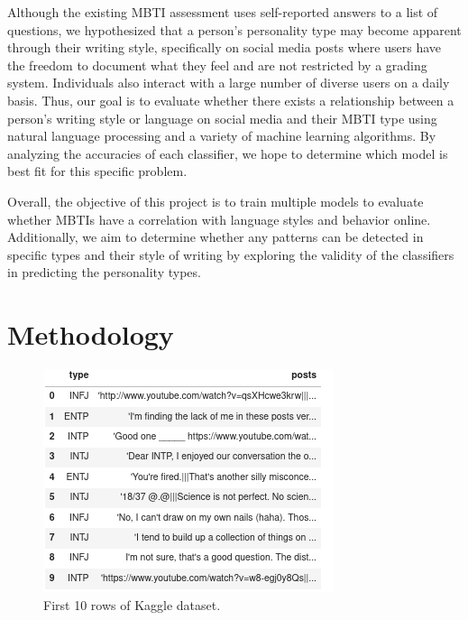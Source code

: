 \documentclass{article}
\begin{document}
Although the existing MBTI assessment uses self-reported answers to a list of questions, we hypothesized that a person’s personality type may become apparent through their writing style, specifically on social media posts where users have the freedom to document what they feel and are not restricted by a grading system. Individuals also interact with a large number of diverse users on a daily basis. Thus, our goal is to evaluate whether there exists a relationship between a person’s writing style or language on social media and their MBTI type using natural language processing and a variety of machine learning algorithms. By analyzing the accuracies of each classifier, we hope to determine which model is best fit for this specific problem.

Overall, the objective of this project is to train multiple models to evaluate whether MBTIs have a correlation with language styles and behavior online. Additionally, we aim to determine whether any patterns can be detected in specific types and their style of writing by exploring the validity of the classifiers in predicting the personality types. 


\section{Methodology}
\label{methodology}


\begin{figure}[ht]
\vskip 0.2in
\begin{center}
\centerline{\includegraphics[width=\columnwidth]{image1}}
\caption{First 10 rows of Kaggle dataset.}
\label{data-makeup}
\end{center}
\vskip -0.2in
\end{figure}
\end{document}
